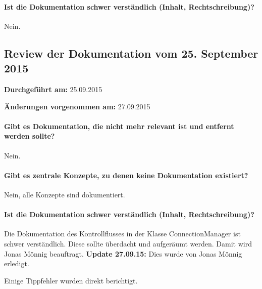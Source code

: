\paragraph{Ist die Dokumentation schwer verständlich (Inhalt, Rechtschreibung)?}
Nein.


\subsection{Review der Dokumentation vom 25. September 2015}

\textbf{Durchgeführt am:} 25.09.2015

\textbf{Änderungen vorgenommen am:} 27.09.2015

\paragraph{Gibt es Dokumentation, die nicht mehr relevant ist und entfernt werden sollte?}
Nein.

\paragraph{Gibt es zentrale Konzepte, zu denen keine Dokumentation existiert?}
Nein, alle Konzepte sind dokumentiert.

\paragraph{Ist die Dokumentation schwer verständlich (Inhalt, Rechtschreibung)?}
Die Dokumentation des Kontrollflusses in der Klasse ConnectionManager ist schwer verständlich. Diese sollte überdacht und aufgeräumt werden. Damit wird Jonas Mönnig beauftragt. \textbf{Update 27.09.15:} Dies wurde von Jonas Mönnig erledigt.

Einige Tippfehler wurden direkt berichtigt.
